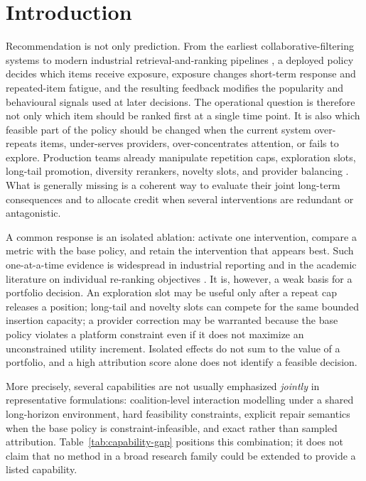 \documentclass[review]{elsarticle}
\theoremstyle{plain}
\theoremstyle{definition}
\theoremstyle{remark}
\begin{document}
\section{Introduction}\label{sec:introduction}

Recommendation is not only prediction. From the earliest collaborative-filtering systems \cite{resnick1994grouplens,sarwar2001item,linden2003amazon} to modern industrial retrieval-and-ranking pipelines \cite{covington2016youtube,ricci2015recommender}, a deployed policy decides which items receive exposure, exposure changes short-term response and repeated-item fatigue, and the resulting feedback modifies the popularity and behavioural signals used at later decisions. The operational question is therefore not only which item should be ranked first at a single time point. It is also which feasible part of the policy should be changed when the current system over-repeats items, under-serves providers, over-concentrates attention, or fails to explore. Production teams already manipulate repetition caps, exploration slots, long-tail promotion, diversity rerankers, novelty slots, and provider balancing \cite{castells2015novelty,abdollahpouri2019popularity,burke2018multistakeholder}. What is generally missing is a coherent way to evaluate their joint long-term consequences and to allocate credit when several interventions are redundant or antagonistic.

A common response is an isolated ablation: activate one intervention, compare a metric with the base policy, and retain the intervention that appears best. Such one-at-a-time evidence is widespread in industrial reporting and in the academic literature on individual re-ranking objectives \cite{ziegler2005improving,vargas2011rank,abdollahpouri2019popularity}. It is, however, a weak basis for a portfolio decision. An exploration slot may be useful only after a repeat cap releases a position; long-tail and novelty slots can compete for the same bounded insertion capacity; a provider correction may be warranted because the base policy violates a platform constraint even if it does not maximize an unconstrained utility increment. Isolated effects do not sum to the value of a portfolio, and a high attribution score alone does not identify a feasible decision.

More precisely, several capabilities are not usually emphasized \emph{jointly} in representative formulations: coalition-level interaction modelling under a shared long-horizon environment, hard feasibility constraints, explicit repair semantics when the base policy is constraint-infeasible, and exact rather than sampled attribution. Table~\ref{tab:capability-gap} positions this combination; it does not claim that no method in a broad research family could be extended to provide a listed capability.
\end{document}
